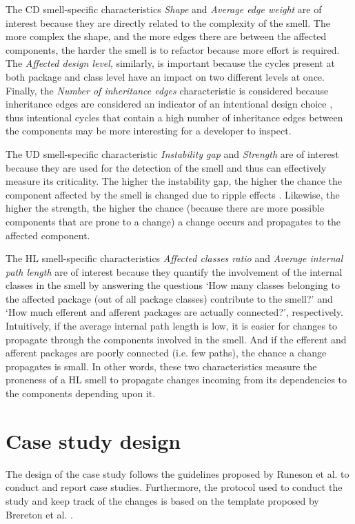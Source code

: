 The CD smell-specific characteristics \emph{Shape} and \emph{Average edge weight} are of interest because they are directly related to the complexity of the smell.
The more complex the shape, and the more edges there are between the affected components, the harder the smell is to refactor because more effort is required.
The \emph{Affected design level}, similarly, is important because the cycles present at both package and class level have an impact on two different levels at once.
Finally, the \emph{Number of inheritance edges} characteristic is considered because inheritance edges are considered an indicator of an intentional design choice \cite{Laval2012}, thus intentional cycles that contain a high number of inheritance edges between the components may be more interesting for a developer to inspect.

The UD smell-specific characteristic \emph{Instability gap} and \emph{Strength} are of interest because they are used for the detection of the smell and thus can effectively measure its criticality. The higher the instability gap, the higher the chance the component affected by the smell is changed due to ripple effects \cite{Martin2018}. Likewise, the higher the strength, the higher the chance (because there are more possible components that are prone to a change) a change occurs and propagates to the affected component.

The HL smell-specific characteristics \emph{Affected classes ratio} and \emph{Average internal path length} are of interest because they quantify the involvement of the internal classes in the smell by answering the questions `How many classes belonging to the affected package (out of all package classes) contribute to the smell?' and `How much efferent and afferent packages are actually connected?', respectively.
Intuitively, if the average internal path length is low, it is easier for changes to propagate through the components involved in the smell. And if the efferent and afferent packages are poorly connected (i.e. few paths), the chance a change propagates is small.
In other words, these two characteristics measure the proneness of a HL smell to propagate changes incoming from its dependencies to the components depending upon it.

\section{Case study design}\label{c2:sec:case-study}
The design of the case study follows the guidelines proposed by Runeson et al. \cite{Runeson2012} to conduct and report case studies.
Furthermore, the protocol used to conduct the study and keep track of the changes is based on the template proposed by Brereton et al. \cite{Brereton2008}.


